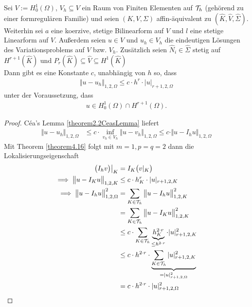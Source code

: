 \begin{theorem}\label{theorem4.17}
Sei $V:=H_0^1(\Omega)$, $V_h\subseteq V$ ein Raum von Finiten Elementen auf $\mathcal{T}_h$ (gehörend zu einer formregulären Familie)  und seien $(K,V,\Sigma)$ affin-äquivalent zu $(\hat{K},\hat{V},\hat{\Sigma})$.\\
Weiterhin sei $a$ eine koerzive, stetige Bilinearform auf $V$ und $l$ eine stetige Linearform auf $V$. Außerdem seien $u\in V$ und $u_h\in V_h$ die eindeutigen Lösungen des Variationsproblems auf $V$ bzw. $V_h$.
Zusätzlich seien $\hat{N}_i\in\hat{\Sigma}$ stetig auf $H^{r+1}(\hat{K})$ und $P_r(\hat{K})\subseteq\hat{V}\subseteq H^1(\hat{K})$\\
Dann gibt es eine Konstante $c$, unabhängig von $h$ so, dass 
\begin{align*}
\Vert u-u_h\Vert_{1,2,\Omega}\leq c\cdot h^r\cdot|u|_{r+1,2,\Omega}
\end{align*}
unter der Voraussetzung, dass
\begin{align*}
u\in H^1_0(\Omega)\cap H^{r+1}(\Omega).
\end{align*}
\end{theorem}
\begin{proof}
Céa's Lemma \ref{theorem2.2CeasLemma} liefert
\begin{align*}
\Vert u-u_h\Vert_{1,2,\Omega}&\leq c\cdot \inf\limits_{v_h\in V_h}\Vert u-v_h\Vert_{1,2,\Omega}
\leq c\cdot\Vert u-I_h u\Vert_{1,2,\Omega}
\end{align*}
Mit Theorem \ref{theorem4.16} folgt mit $m=1,p=q=2$ dann die Lokalisierungseigenschaft
\begin{align*}
\big(I_h v\big)\big|_K&=I_K\big(v|_K\big)\\
\implies
\big\Vert u-I_K u\big\Vert_{1,2,K}&\leq c\cdot h_K^r\cdot|u|_{r+1,2,K}\\
\implies
\big\Vert u-I_h u\big\Vert^2_{1,2,\Omega}
&=\sum\limits_{K\in\mathcal{T}_h}\big\Vert u-I_h u\big\Vert^2_{1,2,K}\\
&=\sum\limits_{K\in\mathcal{T}_h}\big\Vert u-I_K u\big\Vert^2_{1,2,K}\\
&\leq
c\cdot\sum\limits_{K\in\mathcal{T}_h}\underbrace{h_K^{2\cdot r}}_{\leq h^{2\cdot r}}\cdot|u|^2_{r+1,2,K}\\
&\leq c\cdot h^{2\cdot r}\cdot\underbrace{\sum\limits_{K\in\mathcal{T}_h}|u|^2_{r+1,2,K}}_{=|u|^2_{r+1,2,\Omega}}\\
&=c\cdot h^{2\cdot r}\cdot|u|^2_{r+1,2,\Omega}
\end{align*}
\end{proof}


